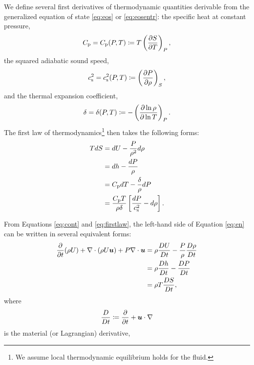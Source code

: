 \documentclass[12pt]{article}
\begin{document}
We define several first derivatives of thermodynamic quantities derivable from the generalized equation of state \eqref{eq:eos} or \eqref{eq:eosentr}: the specific heat at constant pressure, 
\begin{align}\label{eq:cp}
	C_{\rm{p}}=C_{\rm{p}}(P,T)\coloneqq T\left(\frac{\partial S}{\partial T}\right)_P,
\end{align}
the squared adiabatic sound speed,
\begin{align}\label{eq:cs2}
	c_{\rm s}^2=c_{\rm s}^2(P,T)\coloneqq \left(\frac{\partial P}{\partial\rho}\right)_S,
\end{align}
and the thermal expansion coefficient,
\begin{align}
	\delta=\delta(P,T)\coloneqq-\left(\frac{\partial\ln\rho}{\partial\ln T}\right)_P.
\end{align}
The first law of thermodynamics\footnote{We assume local thermodynamic equilibrium holds for the fluid.} then takes the following forms:
\begin{subequations}\label{eq:firstlaw}
	\begin{align}
		TdS &= dU - \frac{P}{\rho^2}d\rho \\
		&= dh - \frac{dP}{\rho}\\
		&= C_{\rm{p}} dT - \frac{\delta}{\rho}dP\\
		&=\frac{C_{\rm{p}} T}{\rho\delta}\left[\frac{dP}{c_{\rm s}^2}-d\rho\right].
	\end{align}
\end{subequations}

	From Equations \eqref{eq:cont} and \eqref{eq:firstlaw}, the left-hand side of Equation \eqref{eq:en} can be written in several equivalent forms:
	\begin{subequations}\label{eq:enlhs}
		\begin{align}
			\frac{\partial}{\partial t}(\rho U) + \nabla\cdot(\rho U\bm{u}) + P\nabla\cdot\bm{u} &= \rho\frac{DU}{Dt} - \frac{P}{\rho}\frac{D\rho}{Dt}\\
			&= \rho\frac{Dh}{Dt} -\frac{DP}{Dt}\\
			&=\rho T \frac{DS}{Dt},
		\end{align}
	\end{subequations}
	where 
	\begin{align}\label{eq:matderiv}
		\frac{D}{Dt}{}\coloneqq \frac{\partial}{\partial t} + \bm{u}\cdot\nabla
	\end{align}
	is the material (or Lagrangian) derivative,
	
\end{document}

